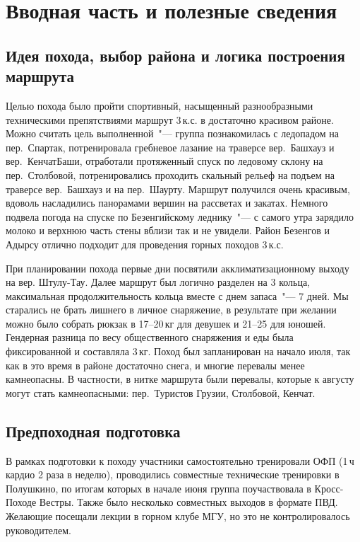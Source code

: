 \section{Вводная часть и полезные сведения}\label{sec:introduction}
	\subsection{Идея похода, выбор района и логика построения маршрута}
		Целью похода было пройти спортивный, насыщенный разнообразными техническими препятствиями маршрут 3\,к.с.
		в достаточно красивом районе. Можно считать цель выполненной~"--- группа познакомилась с ледопадом на
		пер.~Спартак, потренировала гребневое лазание на траверсе вер.~Башхауз и вер.~КенчатБаши, отработали протяженный
		спуск по ледовому склону на пер.~Столбовой, потренировались проходить скальный рельеф на подъем на траверсе
		вер.~Башхауз и на пер.~Шаурту. Маршрут получился очень красивым, вдоволь насладились панорамами вершин на
		рассветах и закатах. Немного подвела погода на спуске по Безенгийскому леднику~"--- с самого утра зарядило молоко
		и верхнюю часть стены вблизи так и не увидели. Район Безенгов и Адырсу отлично подходит для
		проведения горных походов 3\,к.с. 
		
		При планировании похода первые дни посвятили акклиматизационному выходу на вер. Штулу-Тау. Далее маршрут был логично разделен на 3 кольца, максимальная
		продолжительность кольца вместе с днем запаса~"--- 7 дней. Мы старались не брать лишнего в личное снаряжение,
		в результате при желании можно было собрать рюкзак в 17--20\,кг для девушек и 21--25 для юношей. Гендерная разница
		по весу общественного снаряжения и еды была фиксированной и составляла 3\,кг. Поход был запланирован на начало
		июля, так как в это время в районе достаточно снега, и многие перевалы менее камнеопасны. В частности, в
		нитке маршрута были перевалы, которые к августу могут стать камнеопасными: пер.~Туристов Грузии, Столбовой, Кенчат.
	
	
	\subsection{Предпоходная подготовка}
		В рамках подготовки к походу участники самостоятельно тренировали ОФП (1\,ч кардио 2 раза в неделю), проводились
		совместные технические тренировки в Полушкино, по итогам которых в начале июня группа поучаствовала в Кросс-Походе
		Вестры. Также было несколько совместных выходов в формате ПВД. Желающие посещали лекции в горном клубе МГУ, но это
		не контролировалось руководителем.
	

